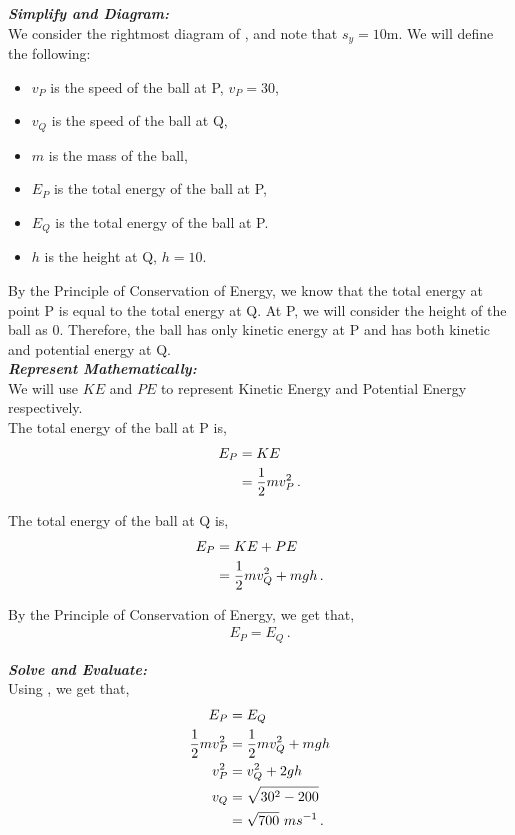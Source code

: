 \begin{subquestions}
\textbf{\textit{Simplify and Diagram:}} \\
We consider the rightmost diagram of , and note that $s_y = 10$m.
We will define the following:
\begin{itemize}
	\item $v_P$ is the speed of the ball at P, $v_P=30$,
	\item $v_Q$ is the speed of the ball at Q,
	\item $m$ is the mass of the ball,
	\item $E_P$ is the total energy of the ball at P,
	\item $E_Q$ is the total energy of the ball at P.
	\item $h$ is the height at Q, $h=10$.
\end{itemize}
By the Principle of Conservation of Energy, we know that the total energy at point P is equal to the total energy at Q. At P, we will consider the height of the ball as 0. Therefore, the ball has only kinetic energy at P and has both kinetic and potential energy at Q. \\





\textbf{\textit{Represent Mathematically:}} \\
We will use $KE$ and $PE$ to represent Kinetic Energy and Potential Energy respectively.\\
The total energy of the ball at P is,
\begin{align}
	E_P & = KE \nonumber \\
	    & = \frac{1}{2}mv_P^2 \,.
\end{align}

The total energy of the ball at Q is,
\begin{align}
	E_P & = KE + PE \nonumber \\
        & = \frac{1}{2}mv_Q^2 + mgh \,.
\end{align}

By the Principle of Conservation of Energy, we get that,
\begin{align}
	E_P = E_Q \label{2005:q6:EEqn1} \,.
\end{align}




\textbf{\textit{Solve and Evaluate:}} \\
Using , we get that,
\begin{align}
	E_P & = E_Q \nonumber \\
	\frac{1}{2}mv_P^2 & = \frac{1}{2}mv_Q^2 + mgh \nonumber \\
	v_P^2 & = v_Q^2 +2gh \nonumber \\
	v_Q & = \sqrt{30^2 - 200} \nonumber \\
	    & = \sqrt{700}~ ms^{-1} \,.
\end{align}
	
\end{subquestions}